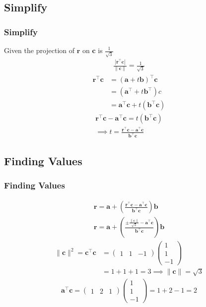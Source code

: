 \documentclass{beamer}
\providecommand{\brak}[1]{\ensuremath{\left(#1\right)}}
\theoremstyle{remark}
\providecommand{\norm}[1]{\lVert#1\rVert}
\newcommand{\myvec}[1]{\ensuremath{\begin{pmatrix}#1\end{pmatrix}}}
\let\vec\mathbf
\numberwithin{equation}{section}
\begin{document}
\subsection{Simplify}
\begin{frame}
\frametitle{Simplify}
Given the projection of $\vec{r}$ on $\vec{c}$ is $\frac{1}{\sqrt{3}}$
\begin{align}
\frac{|\vec{r}^\top\vec{c}|}{\norm{\vec{c}}} = \frac{1}{\sqrt{3}} 
\end{align}
\begin{align}
\vec{r}^\top\vec{c}&=\brak{\vec{a}+t\vec{b}}^\top\vec{c}\\
&=\brak{\vec{a}^\top+t\vec{b}^\top}c \\
&=\vec{a}^\top\vec{c}+t\brak{\vec{b}^\top\vec{c}} 
\end{align}
\begin{align}
\vec{r}^\top\vec{c}-\vec{a}^\top\vec{c}=t\brak{\vec{b}^\top\vec{c}}  \\
\implies t=\frac{\vec{r}^\top\vec{c}-\vec{a}^\top\vec{c}}{\vec{b}^\top\vec{c}}
\end{align}
\end{frame}
\subsection{Finding Values}
\begin{frame}
\frametitle{Finding Values}
\begin{align}
    \vec{r}=\vec{a}+\brak{\frac{\vec{r}^\top\vec{c}-\vec{a}^\top\vec{c}}{\vec{b}^\top\vec{c}}}\vec{b} \\
    \vec{r}=\vec{a}+\brak{\frac{\pm\frac{\norm{\vec{c}}}{\sqrt{3}}-\vec{a}^\top\vec{c}}{\vec{b}^\top\vec{c}}}\vec{b}
\end{align}
\begin{align}
\norm{\vec{c}}^2=\vec{c}^\top\vec{c}&=\myvec{1&1&-1}\myvec{1\\1\\-1} \\
&=1+1+1=3  \implies \norm{\vec{c}}=\sqrt{3}
\end{align} 
\begin{align}
\vec{a}^\top\vec{c}=\myvec{1&2&1}\myvec{1\\1\\-1}=1+2-1=2 
\end{align}
\end{frame}
\end{document}
